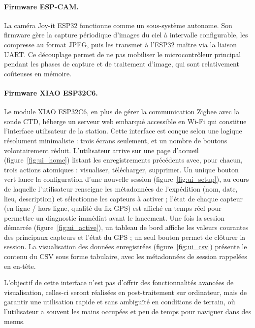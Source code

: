 \paragraph{Firmware ESP-CAM.}
La caméra Joy-it ESP32 fonctionne comme un sous-système autonome. Son firmware
gère la capture périodique d'images du ciel à intervalle configurable, les
compresse au format JPEG, puis les transmet à l'ESP32 maître via la liaison
UART. Ce découplage permet de ne pas mobiliser le microcontrôleur principal
pendant les phases de capture et de traitement d'image, qui sont relativement
coûteuses en mémoire.

\paragraph{Firmware XIAO ESP32C6.}
Le module XIAO ESP32C6, en plus de gérer la communication Zigbee avec la sonde
CTD, héberge un serveur web embarqué accessible en Wi-Fi qui constitue
l'interface utilisateur de la station. Cette interface est conçue selon une
logique résolument minimaliste : trois écrans seulement, et un nombre de boutons
volontairement réduit. L'utilisateur arrive sur une page d'accueil
(figure~\ref{fig:ui_home}) listant les enregistrements précédents avec, pour
chacun, trois actions atomiques : visualiser, télécharger, supprimer. Un unique
bouton vert lance la configuration d'une nouvelle session
(figure~\ref{fig:ui_setup}), au cours de laquelle l'utilisateur renseigne les
métadonnées de l'expédition (nom, date, lieu, description) et sélectionne les
capteurs à activer ; l'état de chaque capteur (en ligne / hors ligne, qualité
du fix GPS) est affiché en temps réel pour permettre un diagnostic immédiat
avant le lancement. Une fois la session démarrée (figure~\ref{fig:ui_active}),
un tableau de bord affiche les valeurs courantes des principaux capteurs et
l'état du GPS ; un seul bouton permet de clôturer la session. La visualisation
des données enregistrées (figure~\ref{fig:ui_csv}) présente le contenu du CSV
sous forme tabulaire, avec les métadonnées de session rappelées en en-tête.

L'objectif de cette interface n'est pas d'offrir des fonctionnalités avancées
de visualisation, celles-ci seront réalisées en post-traitement sur
ordinateur, mais de garantir une utilisation rapide et sans ambiguïté en
conditions de terrain, où l'utilisateur a souvent les mains occupées et peu
de temps pour naviguer dans des menus.


